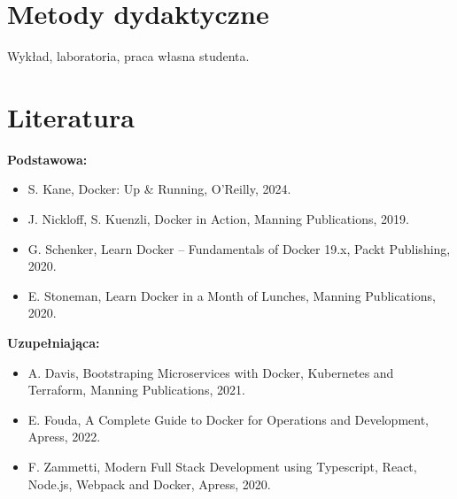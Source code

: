 \documentclass[12pt, a4paper]{article}
\begin{document}
\section{Metody dydaktyczne}

Wykład, laboratoria, praca własna studenta.

\section{Literatura}

\textbf{Podstawowa:}
\begin{itemize}
  \item S. Kane, Docker: Up \& Running, O’Reilly, 2024.
  \item J. Nickloff, S. Kuenzli, Docker in Action, Manning Publications, 2019.
  \item G. Schenker, Learn Docker – Fundamentals of Docker 19.x, Packt Publishing, 2020.
  \item E. Stoneman, Learn Docker in a Month of Lunches, Manning Publications, 2020.
\end{itemize}

\textbf{Uzupełniająca:}
\begin{itemize}
  \item A. Davis, Bootstraping Microservices with Docker, Kubernetes and Terraform, Manning Publications, 2021.
  \item E. Fouda, A Complete Guide to Docker for Operations and Development, Apress, 2022.
  \item F. Zammetti, Modern Full Stack Development using Typescript, React, Node.js, Webpack and Docker, Apress, 2020.
\end{itemize}
\end{document}
